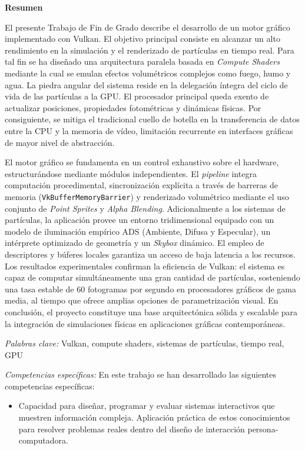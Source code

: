 \begin{center}
    \textbf{Resumen}
\end{center}

\noindent El presente Trabajo de Fin de Grado describe el desarrollo de un motor gráfico implementado con Vulkan. El objetivo principal consiste en alcanzar un alto rendimiento en la simulación y el renderizado de partículas en tiempo real. Para tal fin se ha diseñado una arquitectura paralela basada en \textit{Compute Shaders} mediante la cual se emulan efectos volumétricos complejos como fuego, humo y agua. La piedra angular del sistema reside en la delegación íntegra del ciclo de vida de las partículas a la GPU. El procesador principal queda exento de actualizar posiciones, propiedades fotométricas y dinámicas físicas. Por consiguiente, se mitiga el tradicional cuello de botella en la transferencia de datos entre la CPU y la memoria de vídeo, limitación recurrente en interfaces gráficas de mayor nivel de abstracción.

El motor gráfico se fundamenta en un control exhaustivo sobre el hardware, estructurándose mediante módulos independientes. El \textit{pipeline} integra computación procedimental, sincronización explícita a través de barreras de memoria (\texttt{VkBufferMemoryBarrier}) y renderizado volumétrico mediante el uso conjunto de \textit{Point Sprites} y \textit{Alpha Blending}. Adicionalmente a los sistemas de partículas, la aplicación provee un entorno tridimensional equipado con un modelo de iluminación empírico ADS (Ambiente, Difusa y Especular), un intérprete optimizado de geometría y un \textit{Skybox} dinámico. El empleo de descriptores y búferes locales garantiza un acceso de baja latencia a los recursos. Los resultados experimentales confirman la eficiencia de Vulkan: el sistema es capaz de computar simultáneamente una gran cantidad de partículas, sosteniendo una tasa estable de 60 fotogramas por segundo en procesadores gráficos de gama media, al tiempo que ofrece amplias opciones de parametrización visual. En conclusión, el proyecto constituye una base arquitectónica sólida y escalable para la integración de simulaciones físicas en aplicaciones gráficas contemporáneas.                                      

\vspace{0.5cm}
\textit{Palabras clave:} Vulkan, compute shaders, sistemas de partículas, tiempo real, GPU

\vspace{0.5cm}
\textit{Competencias específicas:} 
En este trabajo se han desarrollado las siguientes competencias específicas:
\begin{itemize}
    \item Capacidad para diseñar, programar y evaluar sistemas interactivos que muestren información compleja. Aplicación práctica de estos conocimientos para resolver problemas reales dentro del diseño de interacción persona-computadora.
\end{itemize}

